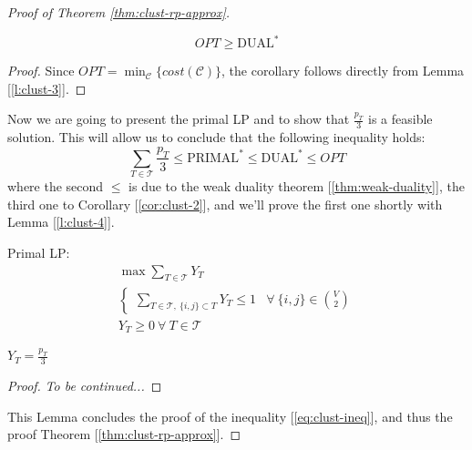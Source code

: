 \begin{proof}[Proof of Theorem \ref{thm:clust-rp-approx}]
    \begin{cor}\label{cor:clust-2}
        \begin{equation}
            OPT \geq \text{DUAL}^*
        \end{equation}
    \end{cor}
    \begin{proof}
        Since $OPT = \min_{\mathscr{C}} \{cost(\mathscr{C})\}$, the corollary follows directly from Lemma [\ref{l:clust-3}].
    \end{proof}

    Now we are going to present the primal LP and to show that $\frac{p_T}{3}$ is a feasible solution. This will allow us to conclude that the following inequality holds:
    \begin{equation}\label{eq:clust-ineq}
        \sum_{T \in \mathscr{T}} \frac{p_T}{3} \leq \text{PRIMAL}^* \leq \text{DUAL}^* \leq OPT
    \end{equation}
    where the second $\leq$ is due to the weak duality theorem [\ref{thm:weak-duality}], the third one to Corollary [\ref{cor:clust-2}], and we'll prove the first one shortly with Lemma [\ref{l:clust-4}].
    
    Primal LP:
    \begin{equation}\label{lp:clust-primal}
        \begin{aligned}
            &\max \sum_{T \in \mathscr{T}} Y_T&\\
            &\begin{cases}
                \sum_{T \in \mathscr{T},\ \{i,j\} \subset T} Y_T \leq 1 & \forall\ \{i,j\} \in \binom{V}{2}
            \end{cases}&\\
            &Y_T \geq 0 \ \forall\ T \in \mathscr{T}&
        \end{aligned}
    \end{equation}
    
    \begin{lem}\label{l:clust-4}
        $Y_T = \frac{p_T}{3}$
    \end{lem}
    \begin{proof}
        \textit{To be continued...}
    \end{proof}

    This Lemma concludes the proof of the inequality [\ref{eq:clust-ineq}], and thus the proof Theorem [\ref{thm:clust-rp-approx}].
\end{proof}













